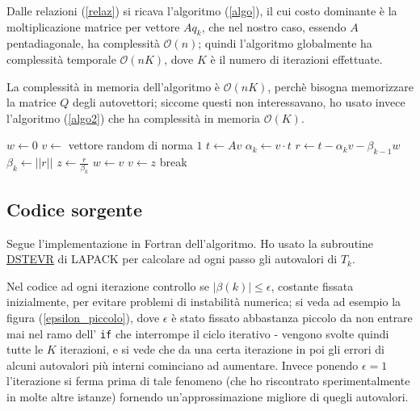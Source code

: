 \documentclass[11pt]{article}
\numberwithin{equation}{subsection}
\newcommand{\norm}[1]{\ensuremath{\left|\left|#1\right|\right|}}
\begin{document}
Dalle relazioni (\ref{relaz}) si ricava l'algoritmo (\ref{algo}), il cui costo dominante è la moltiplicazione matrice per vettore $A q_k$, che nel nostro caso, essendo $A$ pentadiagonale, ha complessità $\mathcal{O}(n)$; quindi l'algoritmo globalmente ha complessità temporale $\mathcal{O}(nK)$, dove $K$ è il numero di iterazioni effettuate.

La complessità in memoria dell'algoritmo è $\mathcal{O}(nK)$, perchè bisogna memorizzare la matrice $Q$ degli autovettori; siccome questi non interessavano, ho usato invece l'algoritmo (\ref{algo2}) che ha complessità in memoria $\mathcal{O}(K)$.

\begin{algorithm}[H]
\caption{}
\label{algo2}
\begin{algorithmic}
\State $w \gets 0$
\State $v \gets$ vettore random di norma $1$
\State $t \gets A v$
\State $\alpha_k \gets v \cdot t$
\State $r \gets t - \alpha_k v - \beta_{k-1}w$
\State $\beta_{k} \gets \norm{r}$
\State $z \gets \frac{r}{\beta_k}$
\State $w \gets v$
\State $v \gets z$
\Else 
\State break
\EndIf
\EndIf
\EndFor
\end{algorithmic}
\end{algorithm}

\subsection{Codice sorgente}
\label{sec-2-1}
Segue l'implementazione in Fortran dell'algoritmo. Ho usato la subroutine \href{http://www.netlib.org/lapack/explore-html/d9/d45/dstevr_8f.html#}{DSTEVR} di LAPACK per calcolare ad ogni passo gli autovalori di $T_k$. 

Nel codice ad ogni iterazione controllo se $|\beta(k)| \leq \epsilon$, costante fissata inizialmente, per evitare problemi di instabilità numerica; si veda ad esempio la figura (\ref{epsilon_piccolo}), dove $\epsilon$ è stato fissato abbastanza piccolo da non entrare mai nel ramo dell' \verb~if~ che interrompe il ciclo iterativo - vengono svolte quindi tutte le $K$ iterazioni, e si vede che da una certa iterazione in poi gli errori di alcuni autovalori più interni cominciano ad aumentare. Invece ponendo $\epsilon = 1$ l'iterazione si ferma prima di tale fenomeno (che ho riscontrato sperimentalmente in molte altre istanze) fornendo un'approssimazione migliore di quegli autovalori.
\end{document}
